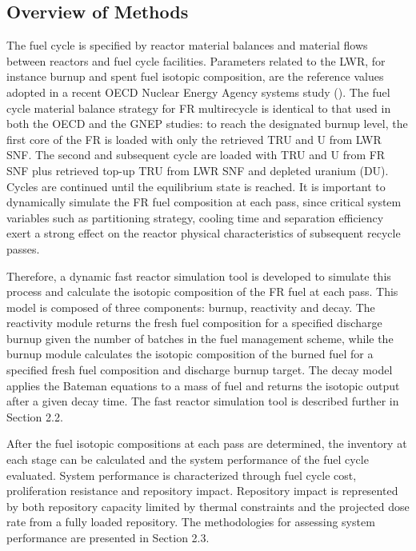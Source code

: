 \subsection{Overview of Methods}
\label{ses_sec:method_overview}
The fuel cycle is specified by reactor material balances and material
flows between reactors and fuel cycle facilities.  Parameters related to
the LWR, for instance burnup and spent fuel isotopic composition, are
the reference values adopted in a recent OECD Nuclear Energy Agency
systems study ().  The fuel cycle material balance strategy for FR
multirecycle is identical to that used in both the OECD and the GNEP
studies: to reach the designated burnup level, the first core of the FR
is loaded with only the retrieved TRU and U from LWR SNF. The second and
subsequent cycle are loaded with TRU and U from FR SNF plus retrieved
top-up TRU from LWR SNF and depleted uranium (DU).  Cycles are continued
until the equilibrium state is reached.  It is important to dynamically
simulate the FR fuel composition at each pass, since critical system
variables such as partitioning strategy, cooling time and separation
efficiency exert a strong effect on the reactor physical characteristics
of subsequent recycle passes. 

Therefore, a dynamic fast reactor simulation tool is developed to
simulate this process and calculate the isotopic composition of the FR
fuel at each pass.  This model is composed of three components: burnup,
reactivity and decay.  The reactivity module returns the fresh fuel
composition for a specified discharge burnup given the number of batches
in the fuel management scheme, while the burnup module calculates the
isotopic composition of the burned fuel for a specified fresh fuel
composition and discharge burnup target.  The decay model applies the
Bateman equations to a mass of fuel and returns the isotopic output
after a given decay time.  The fast reactor simulation tool is described
further in Section 2.2.

After the fuel isotopic compositions at each pass are determined, the
inventory at each stage can be calculated and the system performance of
the fuel cycle evaluated.  System performance is characterized through
fuel cycle cost, proliferation resistance and repository impact. 
Repository impact is represented by both repository capacity limited by
thermal constraints and the projected dose rate from a fully loaded
repository.  The methodologies for assessing system performance are
presented in Section 2.3.



